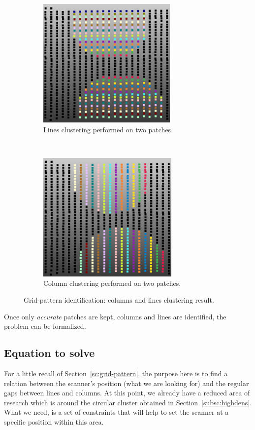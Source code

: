 \begin{figure}[t!]
  \centering
    \begin{subfigure}[t]{0.5\textwidth}
      \centering
        \includegraphics[height=2.5in]{img/grid-lines.png}
        \caption{Lines clustering performed on two patches.}
    \end{subfigure}%
    ~
    \begin{subfigure}[t]{0.5\textwidth}
      \centering
        \includegraphics[height=2.5in]{img/grid-cols.png}
        \caption{Column clustering performed on two patches.}
    \end{subfigure}
    \caption{Grid-pattern identification: columns and lines clustering result.}
    \label{fig:line-col-cluster}
\end{figure}

Once only \emph{accurate} patches are kept, columns and lines are identified, the problem can be formalized.

\subsection{Equation to solve}
\label{subsc:eq}

For a little recall of Section~\ref{sc:grid-pattern}, the purpose here is to find a relation between the scanner's position (what we are looking for) and the regular gaps between lines and columns. At this point, we already have a reduced area of research which is around the circular cluster obtained in Section~\ref{subsc:highdens}. What we need, is a set of constraints that will help to set the scanner at a specific position within this area.

